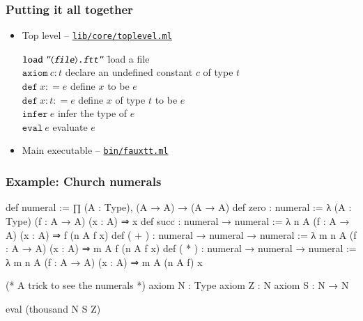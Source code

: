 \documentclass[10pt,aspectratio=169]{beamer}
\newcommand{\codeRef}[1]{\href{https://github.com/andrejbauer/faux-type-theory/blob/main/monadic-fauxtt/#1}{\texttt{#1}}}
\begin{document}
\begin{frame}
  \frametitle{Putting it all together}

  \begin{itemize}
  \item Top level -- \codeRef{lib/core/toplevel.ml}
    \begin{tabbing}
    $\mathtt{load}\ \text{\texttt{\textit{"$\langle$file$\rangle$.ftt"}}}$ \qquad \= load a file \\
    $\mathtt{axiom}\ c : t$ \> declare an undefined constant $c$ of type $t$ \\
    $\texttt{def}\ x \mathrel{{:}{=}} e$ \> define $x$ to be $e$ \\
    $\texttt{def}\ x : t \mathrel{{:}{=}} e$ \> define $x$ of type $t$ to be $e$ \\
    $\mathtt{infer}\ e$ \> infer the type of $e$ \\
    $\mathtt{eval}\ e$ \> evaluate $e$
    \end{tabbing}
  \item Main executable -- \codeRef{bin/fauxtt.ml}
  \end{itemize}


\end{frame}

\begin{frame}[fragile]
  \frametitle{Example: Church numerals}

\begin{fauxttlisting}
def numeral :=
  ∏ (A : Type), (A → A) → (A → A)
def zero : numeral :=
  λ (A : Type) (f : A → A) (x : A) ⇒ x
def succ : numeral → numeral :=
  λ n A (f : A → A) (x : A) ⇒ f (n A f x)
def ( + ) : numeral → numeral → numeral :=
  λ m n A (f : A → A) (x : A) ⇒ m A f (n A f x)
def ( * ) : numeral → numeral → numeral :=
  λ m n A (f : A → A) (x : A) ⇒ m A (n A f) x

(* A trick to see the numerals *)
axiom N : Type
axiom Z : N
axiom S : N → N

eval (thousand N S Z)
\end{fauxttlisting}


\end{frame}
\end{document}
